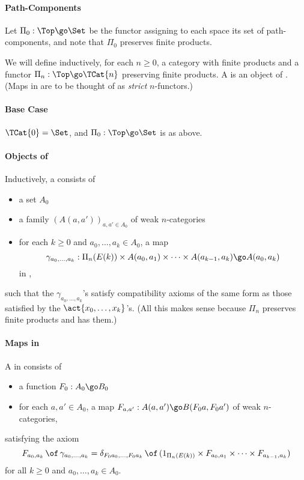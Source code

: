 \paragraph{Path-Components} Let $\Pi_0: \Top \go \Set$ be the functor
assigning to each space its set of path-components, and note that $\Pi_0$
preserves finite products.



We will define inductively, for each $n\geq 0$, a category  with
finite products and a functor $\Pi_n: \Top \go \TCat{n}$ preserving finite
products.  A  is an object of .
(Maps in  are to be thought of as \emph{strict}
$n$-functors.) 


\paragraph{Base Case}

$\TCat{0} = \Set$, and $\Pi_0: \Top \go \Set$ is as above.

\paragraph{Objects of } 

Inductively, a   consists of
%
\begin{itemize}
\item a set $A_0$
\item a family $(A(a,a'))_{a,a'\in A_0}$ of weak $n$-categories
\item for each $k\geq 0$ and $a_0, \ldots, a_k \in A_0$, a map
\[
\gamma_{a_0, \ldots, a_k}:
\Pi_n(E(k)) \times A(a_0,a_1) \times\cdots\times A(a_{k-1},a_k)
\go
A(a_0,a_k)
\]
in ,
\end{itemize}
%
such that the $\gamma_{a_0, \ldots, a_k}$'s satisfy compatibility axioms of
the same form as those satisfied by the $\act{x_0,\ldots,x_k}$'s.  (All this
makes sense because $\Pi_n$ preserves finite products and  has them.)

\paragraph{Maps in } 

A  in  consists of
%
\begin{itemize}
\item a function $F_0: A_0 \go B_0$
\item for each $a,a'\in A_0$, a map $F_{a,a'}: A(a,a') \go B(F_0 a, F_0 a')$ of
weak $n$-categories,
\end{itemize}
%
satisfying the axiom
\[
F_{a_0,a_k} \,\of\, \gamma_{a_0, \ldots, a_k}
=
\delta_{F_0 a_0, \ldots, F_0 a_k} \,\of\, 
(1_{\Pi_n(E(k))} \times F_{a_0,a_1} \times\cdots\times F_{a_{k-1},a_k})
\]
for all $k\geq 0$ and $a_0, \ldots, a_k \in A_0$.

